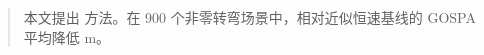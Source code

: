 \begin{abstract}
本文提出 \method 方法。在 900 个非零转弯场景中，\method 相对近似恒速基线的 GOSPA 平均降低 \PrimaryMean m。
\end{abstract}
